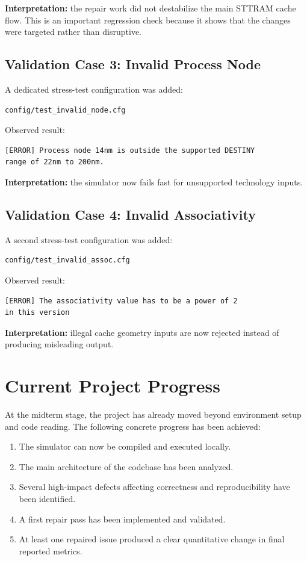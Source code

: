 \documentclass[11pt]{article}
\begin{document}
\textbf{Interpretation:} the repair work did not destabilize the main STTRAM cache flow. This is an important regression check because it shows that the changes were targeted rather than disruptive.

\subsection{Validation Case 3: Invalid Process Node}

A dedicated stress-test configuration was added:

\begin{verbatim}
config/test_invalid_node.cfg
\end{verbatim}

Observed result:

\begin{verbatim}
[ERROR] Process node 14nm is outside the supported DESTINY
range of 22nm to 200nm.
\end{verbatim}

\textbf{Interpretation:} the simulator now fails fast for unsupported technology inputs.

\subsection{Validation Case 4: Invalid Associativity}

A second stress-test configuration was added:

\begin{verbatim}
config/test_invalid_assoc.cfg
\end{verbatim}

Observed result:

\begin{verbatim}
[ERROR] The associativity value has to be a power of 2
in this version
\end{verbatim}

\textbf{Interpretation:} illegal cache geometry inputs are now rejected instead of producing misleading output.

\section{Current Project Progress}

At the midterm stage, the project has already moved beyond environment setup and code reading. The following concrete progress has been achieved:

\begin{enumerate}[leftmargin=1.5em]
    \item The simulator can now be compiled and executed locally.
    \item The main architecture of the codebase has been analyzed.
    \item Several high-impact defects affecting correctness and reproducibility have been identified.
    \item A first repair pass has been implemented and validated.
    \item At least one repaired issue produced a clear quantitative change in final reported metrics.
\end{enumerate}
\end{document}
